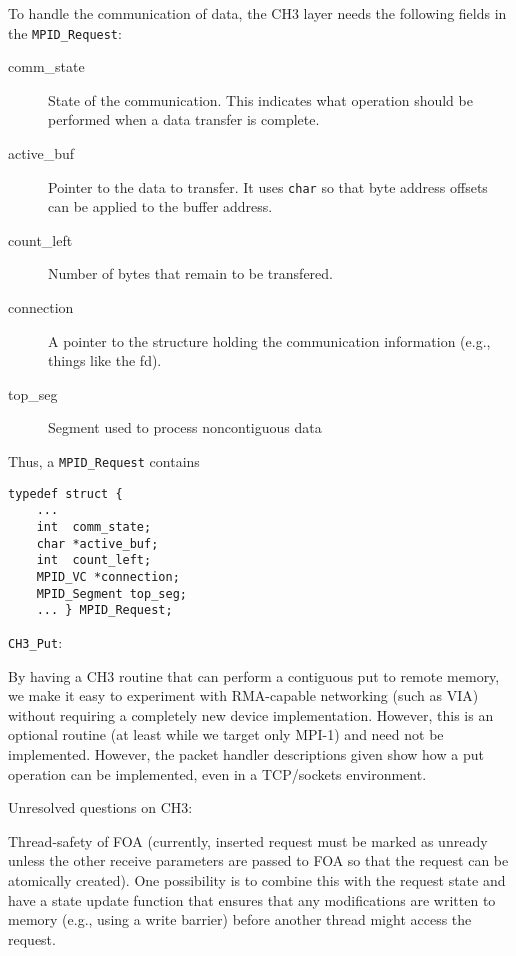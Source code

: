 \documentclass{article}
\def\code{\begingroup\makeustext\eatcode}
\def\eatcode#1{\texttt{#1}\endgroup}
\begin{document}
To handle the communication of data, the CH3 layer needs the following fields
in the \code{MPID_Request}:
\begin{description}
\item[comm\_state]State of the communication.  This indicates what operation
  should be performed when a data transfer is complete.
\item[active\_buf]Pointer to the data to transfer.  It uses \code{char} so
  that byte address offsets can be applied to the buffer address.
\item[count\_left]Number of bytes that remain to be transfered.
\item[connection]A pointer to the structure holding the communication
  information (e.g., things like the fd).
\item[top\_seg]Segment used to process noncontiguous data
\end{description}

Thus, a \code{MPID_Request} contains
\begin{verbatim}
typedef struct { 
    ...
    int  comm_state;
    char *active_buf;
    int  count_left;
    MPID_VC *connection;
    MPID_Segment top_seg;
    ... } MPID_Request;
\end{verbatim}


\code{CH3_Put}:

By having a CH3 routine that can perform a contiguous put to remote memory, we
make it easy to experiment with RMA-capable networking (such as VIA) without
requiring a completely new device implementation.  However, this is an
optional routine (at least while we target only MPI-1) and need not be
implemented.  However, the packet handler descriptions given show how a put
operation can be implemented, even in a TCP/sockets environment.

Unresolved questions on CH3:


Thread-safety of FOA (currently, inserted request must be marked as unready
unless the other receive parameters are passed to FOA so that the request can
be atomically created).  One possibility is to combine this with the request
state and have a state update function that ensures that any modifications are
written to memory (e.g., using a write barrier) before another thread might
access the request.
\end{document}

